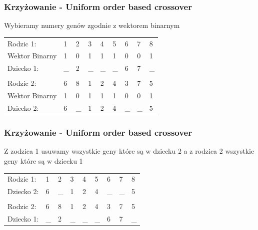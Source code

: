 \documentclass{beamer}
\begin{document}
\begin{frame}
 \frametitle{Krzyżowanie - Uniform order based crossover}
 Wybieramy numery genów zgodnie z wektorem binarnym
\begin{center}
\begin{tabular}{lllllllll}
Rodzic 1: & 1 & {\color{red}2}& 3 & 4 & 5 & {\color{red}6} & {\color{red}7} & 8\\
Wektor Binarny & 1 & {\color{red}0}& 1 & 1 & 1 & {\color{red}0} & {\color{red}0} & 1 \\
Dziecko 1: & \_ & {\color{red}2} & \_ & \_ & \_ & {\color{red}6} & {\color{red}7} & \_\\ \\
Rodzic 2: & {\color{red}6} & 8 & {\color{red}1} & {\color{red}2} & {\color{red}4} & 3 & 7 & {\color{red}5}\\
Wektor Binarny & {\color{red}1} & 0 &{\color{red}1}  & {\color{red}1} & {\color{red}1} & 0 & 0 & {\color{red}1} \\
Dziecko 2: & {\color{red}6} & \_ & {\color{red}1} & {\color{red}2} & {\color{red}4} & \_ & \_ & {\color{red}5}\\
\end{tabular}
\end{center}

 

\end{frame}


\begin{frame}
 \frametitle{Krzyżowanie - Uniform order based crossover}
 Z zodzica 1  usuwamy wszystkie geny które są w dziecku 2 a z rodzica 2 wszystkie geny które są w dziecku 1
\begin{center}
\begin{tabular}{lllllllll}
Rodzic 1: & {\color{red}1} & {\color{red}2}& 3 & {\color{red}4} & {\color{red}5} & {\color{red}6} & 7 & 8\\
Dziecko 2: & {\color{red}6} & \_ & {\color{red}1} & {\color{red}2} & {\color{red}4} & \_ & \_ & {\color{red}5}\\ \\

Rodzic 2: & {\color{red}6} & 8 & 1 & {\color{red}2} & 4 & 3 & {\color{red}7} & 5\\
Dziecko 1: & \_ & {\color{red}2} & \_ & \_ & \_ & {\color{red}6} & {\color{red}7} & \_\\


\end{tabular}
\end{center}

 

\end{frame}
\end{document}

